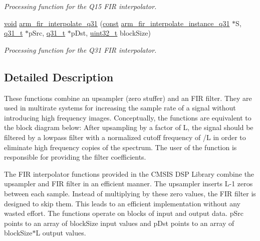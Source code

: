 \begin{DoxyCompactItemize}
\begin{DoxyCompactList}\small\item\em Processing function for the Q15 F\-I\-R interpolator. \end{DoxyCompactList}\item 
\hyperlink{group___n_a_m_e_ga18028b8badbf1ea7e704ccac3c488e82}{void} \hyperlink{group___f_i_r___interpolate_gaac9c0f01ed91c53f7083995d7411f5ee}{arm\-\_\-fir\-\_\-interpolate\-\_\-q31} (\hyperlink{group___n_a_m_e_ga7ae6d0e43244213b34de2c2b9aa30da6}{const} \hyperlink{structarm__fir__interpolate__instance__q31}{arm\-\_\-fir\-\_\-interpolate\-\_\-instance\-\_\-q31} $\ast$S, \hyperlink{arm__math_8h_adc89a3547f5324b7b3b95adec3806bc0}{q31\-\_\-t} $\ast$p\-Src, \hyperlink{arm__math_8h_adc89a3547f5324b7b3b95adec3806bc0}{q31\-\_\-t} $\ast$p\-Dst, \hyperlink{stdint_8h_a435d1572bf3f880d55459d9805097f62}{uint32\-\_\-t} block\-Size)
\begin{DoxyCompactList}\small\item\em Processing function for the Q31 F\-I\-R interpolator. \end{DoxyCompactList}\end{DoxyCompactItemize}


\subsection{Detailed Description}
These functions combine an upsampler (zero stuffer) and an F\-I\-R filter. They are used in multirate systems for increasing the sample rate of a signal without introducing high frequency images. Conceptually, the functions are equivalent to the block diagram below\-:  After upsampling by a factor of {\ttfamily L}, the signal should be filtered by a lowpass filter with a normalized cutoff frequency of {/\-L} in order to eliminate high frequency copies of the spectrum. The user of the function is responsible for providing the filter coefficients.

The F\-I\-R interpolator functions provided in the C\-M\-S\-I\-S D\-S\-P Library combine the upsampler and F\-I\-R filter in an efficient manner. The upsampler inserts {\ttfamily L-\/1} zeros between each sample. Instead of multiplying by these zero values, the F\-I\-R filter is designed to skip them. This leads to an efficient implementation without any wasted effort. The functions operate on blocks of input and output data. {\ttfamily p\-Src} points to an array of {\ttfamily block\-Size} input values and {\ttfamily p\-Dst} points to an array of {\ttfamily block\-Size$\ast$\-L} output values.

